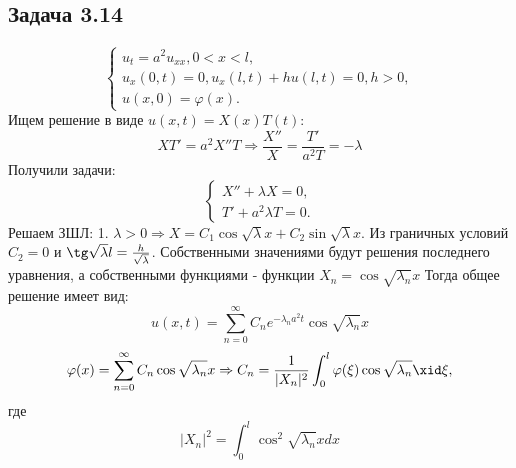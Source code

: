 \documentclass[11pt]{article}
\begin{document}
\subsection{Задача 3.14}
\label{sec:org29d8468}
\begin{equation}
\begin{cases}
u_t = a^2u_{xx}, 0 < x < l, \\
u_x(0, t) = 0, u_x(l, t) + hu(l, t) = 0, h > 0, \\
u(x, 0) = \varphi(x).
\end{cases}
\end{equation}
Ищем решение в виде $u(x, t) = X(x)T(t)$:
\begin{equation}
XT' = a^2X''T \Rightarrow \frac{X''}X = \frac{T'}{a^2T} = -\lambda
\end{equation}
Получили задачи:
\begin{equation}
\begin{cases}
X'' + \lambda X = 0, \\
T' + a^2\lambda T = 0.
\end{cases}
\end{equation}
Решаем ЗШЛ:
1. $\lambda > 0 \Rightarrow X = C_1\cos\sqrt{\lambda}x + C_2\sin\sqrt{\lambda}x$.
Из граничных условий $C_2 = 0$ и $\tg\sqrt{\lambda}l = \frac{h}{\sqrt{\lambda}}$.
Собственными значениями будут решения последнего уравнения, а собственными функциями -
функции $X_n = \cos\sqrt{\lambda_n}x$
Тогда общее решение имеет вид:
\begin{equation}
u(x, t) = \sum_{n = 0}^{\infty}C_ne^{-\lambda_na^2t}\cos\sqrt{\lambda_n}x
\end{equation}
\begin{equation}
\varphi(x) = \sum_{n = 0}^{\infty}C_n\cos\sqrt{\lambda_n}x \Rightarrow C_n = \frac1{|X_n|^2}\int_0^l\varphi(\xi)\cos\sqrt{\lambda_n}\xid\xi,
\end{equation}
где
\begin{equation}
|X_n|^2 = \int_0^l\cos^2\sqrt{\lambda_n}xdx
\end{equation}
\end{document}
